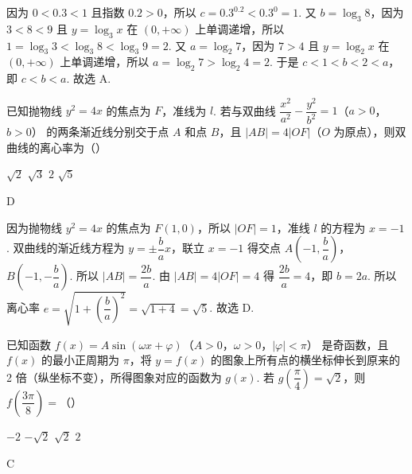 \begin{solution}
因为 \(0<0.3<1\) 且指数 \(0.2>0\)，所以 \(c=0.3^{0.2}<0.3^{0}=1\). 又 \(b=\log_{3}8\)，因为 \(3<8<9\) 且 \(y=\log_{3}x\) 在 \(\left(0,+\infty\right)\) 上单调递增，所以 \(1=\log_{3}3<\log_{3}8<\log_{3}9=2\). 又 \(a=\log_{2}7\)，因为 \(7>4\) 且 \(y=\log_{2}x\) 在 \(\left(0,+\infty\right)\) 上单调递增，所以 \(a=\log_{2}7>\log_{2}4=2\). 于是 \(c<1<b<2<a\)，即 \(c<b<a\). 故选 A.
\end{solution}

\begin{problem}
已知抛物线 \(y^2=4x\) 的焦点为 \(F\)，准线为 \(l\). 若与双曲线 \(\dfrac{x^2}{a^2}-\dfrac{y^2}{b^2}=1\)（\(a>0\)，\(b>0\)） 的两条渐近线分别交于点 \(A\) 和点 \(B\)，且 \(|AB|=4|OF|\)（\(O\) 为原点），则双曲线的离心率为（\quad）

\choices
    {\(\sqrt2\)}
    {\(\sqrt3\)}
    {\(2\)}
    {\(\sqrt5\)}
\end{problem}

\begin{answer}
D
\end{answer}

\begin{solution}
因为抛物线 \(y^{2}=4x\) 的焦点为 \(F\left(1,0\right)\)，所以 \(\left|OF\right|=1\)，准线 \(l\) 的方程为 \(x=-1\). 双曲线的渐近线方程为 \(y=\pm\dfrac{b}{a}x\)，联立 \(x=-1\) 得交点 \(A\left(-1,\dfrac{b}{a}\right)\)，\(B\left(-1,-\dfrac{b}{a}\right)\). 所以 \(\left|AB\right|=\dfrac{2b}{a}\). 由 \(\left|AB\right|=4\left|OF\right|=4\) 得 \(\dfrac{2b}{a}=4\)，即 \(b=2a\). 所以离心率 \(e=\sqrt{1+\left(\dfrac{b}{a}\right)^{2}}=\sqrt{1+4}=\sqrt{5}\). 故选 D.
\end{solution}

\begin{problem}
已知函数 \(f(x)=A\sin(\omega x+\varphi)\)（\(A>0\)，\(\omega>0\)，\(|\varphi|<\pi\)） 是奇函数，且 \(f(x)\) 的最小正周期为 \(\pi\)，将 \(y=f(x)\) 的图象上所有点的横坐标伸长到原来的 2 倍（纵坐标不变），所得图象对应的函数为 \(g(x)\). 若 \(g\!\left(\dfrac{\pi}{4}\right)=\sqrt2\)，则 \(f\!\left(\dfrac{3\pi}{8}\right)=\)（\quad）

\choices
    {\(-2\)}
    {\(-\sqrt2\)}
    {\(\sqrt2\)}
    {\(2\)}
\end{problem}

\begin{answer}
C
\end{answer}


